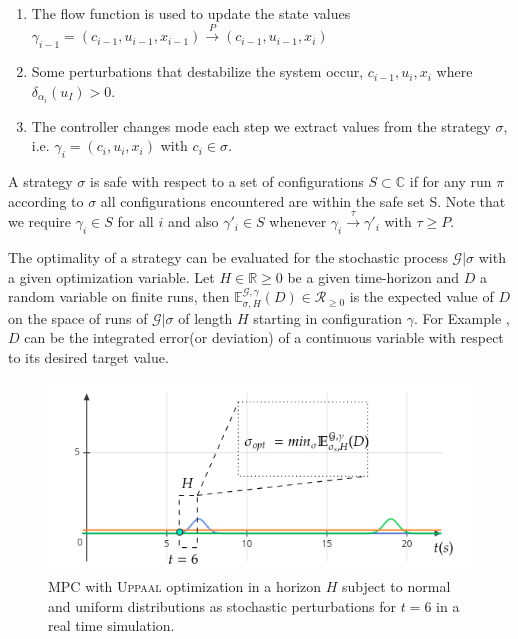     \begin{enumerate}
      \item The flow function is used to update the state values
      $\gamma_{i-1}=(c_{i-1}, u_{i-1}, x_{i-1}) \xrightarrow{P} (c_{i-1}, u_{i-1}, x_{i})$ 
      \item Some perturbations that destabilize the system occur, 
      $c_{i-1},u_i,x_i$ where $\delta_{\alpha_i}(u_I) > 0$.
      \item The controller changes mode each step we extract 
      values from the strategy $\sigma$, i.e. $\gamma_i=(c_i,u_i,x_i)$ 
      with $c_i \in \sigma$. 
    \end{enumerate}
    

    
    
    A strategy $\sigma$ is safe with respect to a set of configurations
    $S \subset \mathbb{C}$ if for any run $\pi$ according to $\sigma$ 
    all configurations encountered are within the safe set S.
    Note that we require $\gamma_i \in S$ for all $i$ and also 
    $\gamma'_i \in S$ whenever $\gamma_i \xrightarrow{\tau} \gamma'_i$ 
    with $\tau \geqslant P$.
    
    The optimality of a strategy can be evaluated for the stochastic 
    process $\mathcal{G}|\sigma$ with a given optimization variable.
    Let $H \in \mathbb{R} \geqslant 0$ be a given time-horizon and $D$
    a random variable on finite runs, then $\mathbb{E}^{\mathcal{G},
    \gamma}_{\sigma,H}(D) \in \mathcal{R}_{\geqslant 0}$ is the 
    expected value of $D$ on the space of runs of $\mathcal{G|\sigma}$
    of length $H$ starting in configuration $\gamma$. For Example
    , $D$ can be the integrated error(or deviation) of a continuous 
    variable with respect to its desired target value.

    \clearpage

    \begin{figure}[!hbt]
      \centering
      \includegraphics[width=0.7\linewidth]{images/realtime}      
      \caption{\ac{MPC} with \textsc{Uppaal} optimization in a 
      horizon $H$ subject to normal and uniform distributions as stochastic perturbations for $t=6$ in a real time simulation.}
      \label{fig:realtime}
    \end{figure}
    
